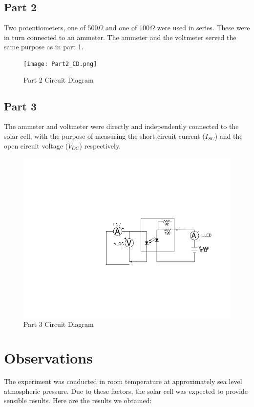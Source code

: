 \documentclass[12pt]{article}
\begin{document}
\subsection{Part 2}

Two potentiometers, one of 500\(\Omega\) and one of 100\(\Omega\) were used in series. These were in turn connected to an ammeter. The ammeter and the voltmeter served the same purpose as in part 1.

\begin{figure}[H]
	\centering
	\texttt{[image: Part2\_CD.png]}
	\caption{Part 2 Circuit Diagram}
\end{figure}

\subsection{Part 3}

The ammeter and voltmeter were directly and independently connected to the solar cell, with the purpose of measuring the short circuit current (\(I_{SC}\)) and the open circuit voltage (\(V_{OC}\)) respectively.

\begin{figure}[H]
	\centering
	\includegraphics[width = 0.8\linewidth, trim = {7cm 6.5cm 2.5cm 8cm}, clip]{Part3_CD.png}
	\caption{Part 3 Circuit Diagram}
\end{figure}

\section{Observations}

The experiment was conducted in room temperature at approximately sea level atmospheric pressure. Due to these factors, the solar cell was expected to provide sensible results. Here are the results we obtained:
\end{document}
